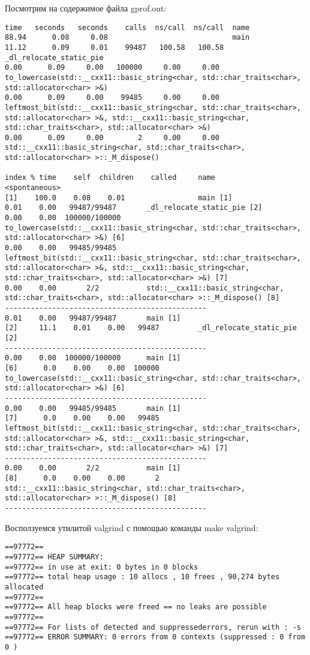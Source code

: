 Посмотрим на содержимое файла gprof.out:
\begin{lstlisting}
time   seconds   seconds    calls  ns/call  ns/call  name    
88.94      0.08     0.08                             main
11.12      0.09     0.01    99487   100.58   100.58  _dl_relocate_static_pie
0.00      0.09     0.00   100000     0.00     0.00  to_lowercase(std::__cxx11::basic_string<char, std::char_traits<char>, std::allocator<char> >&)
0.00      0.09     0.00    99485     0.00     0.00  leftmost_bit(std::__cxx11::basic_string<char, std::char_traits<char>, std::allocator<char> >&, std::__cxx11::basic_string<char, std::char_traits<char>, std::allocator<char> >&)
0.00      0.09     0.00        2     0.00     0.00  std::__cxx11::basic_string<char, std::char_traits<char>, std::allocator<char> >::_M_dispose()

index % time    self  children    called     name
<spontaneous>
[1]    100.0    0.08    0.01                 main [1]
0.01    0.00   99487/99487       _dl_relocate_static_pie [2]
0.00    0.00  100000/100000      to_lowercase(std::__cxx11::basic_string<char, std::char_traits<char>, std::allocator<char> >&) [6]
0.00    0.00   99485/99485       leftmost_bit(std::__cxx11::basic_string<char, std::char_traits<char>, std::allocator<char> >&, std::__cxx11::basic_string<char, std::char_traits<char>, std::allocator<char> >&) [7]
0.00    0.00       2/2           std::__cxx11::basic_string<char, std::char_traits<char>, std::allocator<char> >::_M_dispose() [8]
-----------------------------------------------
0.01    0.00   99487/99487       main [1]
[2]     11.1    0.01    0.00   99487         _dl_relocate_static_pie [2]
-----------------------------------------------
0.00    0.00  100000/100000      main [1]
[6]      0.0    0.00    0.00  100000         to_lowercase(std::__cxx11::basic_string<char, std::char_traits<char>, std::allocator<char> >&) [6]
-----------------------------------------------
0.00    0.00   99485/99485       main [1]
[7]      0.0    0.00    0.00   99485         leftmost_bit(std::__cxx11::basic_string<char, std::char_traits<char>, std::allocator<char> >&, std::__cxx11::basic_string<char, std::char_traits<char>, std::allocator<char> >&) [7]
-----------------------------------------------
0.00    0.00       2/2           main [1]
[8]      0.0    0.00    0.00       2         std::__cxx11::basic_string<char, std::char_traits<char>, std::allocator<char> >::_M_dispose() [8]
-----------------------------------------------
\end{lstlisting}

Восползуемся утилитой valgrind с помощью команды make valgrind:
\begin{lstlisting}
==97772==
==97772== HEAP SUMMARY:
==97772== in use at exit: 0 bytes in 0 blocks
==97772== total heap usage : 10 allocs , 10 frees , 90,274 bytes allocated
==97772==
==97772== All heap blocks were freed == no leaks are possible
==97772==
==97772== For lists of detected and suppressederrors, rerun with : -s
==97772== ERROR SUMMARY: 0 errors from 0 contexts (suppressed : 0 from 0 )
\end{lstlisting}
\pagebreak

